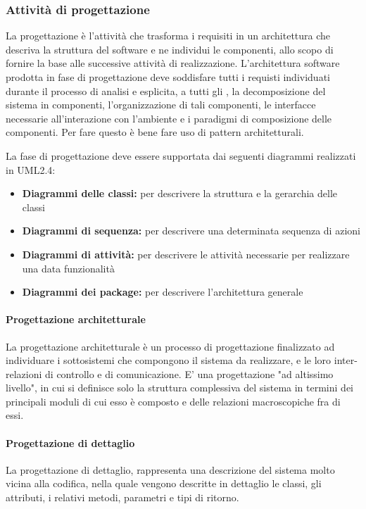 \documentclass[12pt,a4paper]{article}
\begin{document}
\subsubsection{Attività di progettazione}
La progettazione è l'attività che trasforma i requisiti in un architettura che descriva la struttura del software e ne individui le componenti, allo scopo di fornire la base alle successive attività di realizzazione. L'architettura software prodotta in fase di progettazione deve soddisfare tutti i requisti individuati durante il processo di analisi e esplicita, a tutti gli , la decomposizione del sistema in componenti, l'organizzazione di tali componenti, le interfacce necessarie all'interazione con l'ambiente e i paradigmi di composizione delle componenti. Per fare questo è bene fare uso di pattern architetturali.

La fase di progettazione deve essere supportata dai seguenti diagrammi realizzati in UML2.4:
\begin{itemize}
	\item \textbf{Diagrammi delle classi:} per descrivere la struttura e la gerarchia delle classi
	\item \textbf{Diagrammi di sequenza:} per descrivere una determinata sequenza di azioni
	\item \textbf{Diagrammi di attività:} per descrivere le attività necessarie per realizzare una data funzionalità
	\item \textbf{Diagrammi dei package:} per descrivere l'architettura generale
\end{itemize}




\paragraph{Progettazione architetturale}
\TODO{}
La progettazione architetturale è un processo di progettazione finalizzato ad individuare i sottosistemi che compongono il sistema da realizzare, e le loro inter-relazioni di controllo e di comunicazione.
E' una progettazione "ad altissimo livello", in cui si definisce solo la struttura complessiva del sistema in termini dei principali moduli di cui esso è composto e delle relazioni macroscopiche fra di essi.

\paragraph{Progettazione di dettaglio}
\TODO{}
La progettazione di dettaglio, rappresenta una descrizione del sistema molto vicina alla codifica, nella quale vengono descritte in dettaglio le classi, gli attributi, i relativi metodi, parametri e tipi di ritorno.
\end{document}
